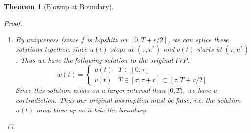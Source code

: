 \documentclass[12pt]{amsart}         %
\newtheorem{theorem}{Theorem}[section]
\theoremstyle{remark}
\begin{document}
\begin{theorem}[Blowup at Boundary]
\begin{proof}
\begin{enumerate}
\item By uniqueness (since $f$ is Lipshitz on $[0, T + r/2]$, we can splice these solutions together, since $u(t)$ stops at $(\tau, u^*)$ and $v(t)$ starts at $(\tau, u^*)$. Thus we have the following solution to the original IVP.
\[
w(t) = \begin{cases}
u(t) & T \in [0, \tau] \\
v(t) & T \in [\tau, \tau + r] \subset [\tau, T + r/2]
\end{cases}
\]
Since this solution exists on a larger interval than $[0, T)$, we have a contradiction. Thus our original assumption must be false, i.e. the solution $u(t)$ must blow up as it hits the boundary.
\end{enumerate}
\end{proof}
\end{theorem}
\end{document}
